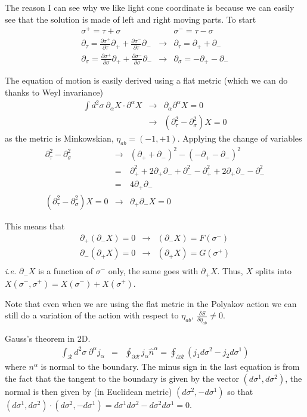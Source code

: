 \documentclass[aps,preprint,preprintnumbers,nofootinbib,showpacs,prd]{revtex4-1}
\newcommand{\ie}{{\it i.e.} }
\newcommand{\nbea}{\begin{eqnarray*}}
\newcommand{\neea}{\end{eqnarray*}}
\begin{document}
The reason I can see why we like light cone coordinate is because we can easily see that the solution is made of left and right moving parts. To start
%
\nbea
\sigma^+ = \tau + \sigma & ~ & \sigma^- = \tau - \sigma \\
\partial_\tau = \frac{\partial \sigma^+}{\partial \tau} \partial_+ + \frac{\partial \sigma^-}{\partial \tau} \partial_- & \rightarrow & \partial_\tau = \partial_+ + \partial_- \\
\partial_\sigma = \frac{\partial \sigma^+}{\partial \sigma} \partial_+ + \frac{\partial \sigma^-}{\partial \sigma} \partial_- & \rightarrow & \partial_\sigma = -\partial_+ - \partial_-
\neea
%

The equation of motion is easily derived using a flat metric (which we can do thanks to Weyl invariance)
%
\nbea
\int d^2\sigma~ \partial_\alpha X \cdot \partial^\alpha X & \rightarrow & \partial_\alpha \partial^\alpha X = 0 \\
& \rightarrow & (\partial_\tau^2 - \partial_\sigma^2 ) X = 0
\neea
%
as the metric is Minkowskian, $\eta_{ab} = (-1, +1)$. Applying the change of variables
%
\nbea
\partial_\tau^2 - \partial_\sigma^2  & \rightarrow & (\partial_+ + \partial_-)^2 - (-\partial_+ - \partial_-)^2 \\
& = & \partial_+^2 + 2\partial_+ \partial_- + \partial_-^2 -\partial_+^2 + 2\partial_+ \partial_- - \partial_-^2 \\
& = & 4 \partial_+\partial_- \\
(\partial_\tau^2 - \partial_\sigma^2 ) X = 0 & \rightarrow & \partial_+\partial_- X = 0
\neea
%

This means that
%
\nbea
\partial_+ (\partial_-X) = 0 & \rightarrow & (\partial_-X) = F (\sigma^-) \\
\partial_- (\partial_+X) = 0 & \rightarrow & (\partial_+X) = G (\sigma^+) \\
\neea 
%
\ie $\partial_- X$ is a function of $\sigma^-$ only, the same goes with $\partial_+X$. Thus, $X$ splits into $X(\sigma^-,\sigma^+) = X(\sigma^-) + X(\sigma^+)$.

Note that even when we are using the flat metric in the Polyakov action we can still do a variation of the action with respect to $\eta_{ab}$, $\frac{\delta S}{\delta \eta_{ab}} \neq 0$.


Gauss's theorem in 2D. 
%
\nbea
\int_{\mathcal{R}} d^2\sigma~\partial^\alpha j_\alpha & = & \oint_{\partial \mathcal{R}} j_\alpha \hat n^\alpha = \oint_{\partial \mathcal{R}} \left (j_1 d\sigma^2 - j_2 d\sigma^1 \right )
\neea
%
where $n^\alpha$ is normal to the boundary. The minus sign in the last equation is from the fact that the tangent to the boundary is given by the vector $(d\sigma^1,d\sigma^2)$, the normal is then given by (in Euclidean metric) $(d\sigma^2,-d\sigma^1)$ so that $(d\sigma^1,d\sigma^2) \cdot (d\sigma^2,-d\sigma^1) = d\sigma^1 d\sigma^2 - d\sigma^2 d\sigma^1 = 0$.
\end{document}
